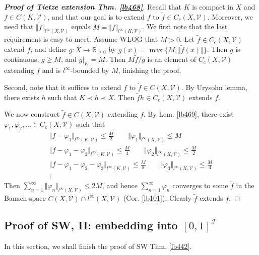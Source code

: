 \documentclass[12pt,b5paper,notitlepage]{article}
\theoremstyle{definition}
\theoremstyle{plain}
\newcommand{\mc}{\mathcal}
\newcommand{\wtd}{\widetilde}
\newcommand{\scr}{\mathscr}
\newcommand{\Rbb}{\mathbb R}
\numberwithin{equation}{section}
\begin{document}
\begin{proof}[\textbf{Proof of Tietze extension Thm. \ref{lb468}}]
Recall that $K$ is compact in $X$ and $f\in C(K,\mc V)$, and that our goal is to extend $f$ to $\wtd f\in C_c(X,\mc V)$. Moreover, we need that $\Vert\wtd f\Vert_{l^\infty(X,\mc V)}$ equals $M=\Vert f\Vert_{l^\infty(K,\mc V)}$. We first note that the last requirement is easy to meet. Assume WLOG that $M>0$. Let $\wtd f\in C_c(X,\mc V)$ extend $f$, and define $g:X\rightarrow\Rbb_{\geq0}$ by $g(x)=\max\{M,\Vert\wtd f(x)\Vert\}$. Then $g$ is continuous, $g\geq M$, and $g|_K=M$. Then $M\wtd f/g$ is an element of $C_c(X,\mc V)$ extending $f$ and is $l^\infty$-bounded by $M$, finishing the proof.

Second, note that it suffices to extend $f$ to $\wtd f\in C(X,\mc V)$. By Urysohn lemma, there exists $h$ such that $K\prec h\prec X$. Then $\wtd fh\in C_c(X,\mc V)$ extends $f$.

We now construct $\wtd f\in C(X,\mc V)$ extending $f$. By Lem. \ref{lb469}, there exist $\varphi_1,\varphi_2,\dots\in C_c(X,\mc V)$ such that
\begin{gather*}
\Vert f-\varphi_1\Vert_{l^\infty(K,\mc V)}\leq \frac M2\qquad \Vert \varphi_1\Vert_{l^\infty(X,\mc V)}\leq M\\
\Vert f-\varphi_1-\varphi_2\Vert_{l^\infty(K,\mc V)}\leq \frac M4\qquad \Vert \varphi_2\Vert_{l^\infty(X,\mc V)}\leq \frac M2\\
\Vert f-\varphi_1-\varphi_2-\varphi_3\Vert_{l^\infty(K,\mc V)}\leq \frac M8\qquad \Vert \varphi_3\Vert_{l^\infty(X,\mc V)}\leq \frac M4\\
\vdots
\end{gather*}
Then $\sum_{n=1}^\infty\Vert \varphi_n\Vert_{l^\infty(X,\mc V)}\leq 2M$, and hence $\sum_{n=1}^\infty\varphi_n$ converges to some $\wtd f$ in the Banach space $C(X,\mc V)\cap l^\infty(X,\mc V)$ (Cor. \ref{lb101}). Clearly $\wtd f$ extends $f$.
\end{proof}



\subsection{Proof of SW, II: embedding into $[0,1]^{\scr I}$}\label{lb473}

In this section, we shall finish the proof of SW Thm. \ref{lb442}.
\end{document}
